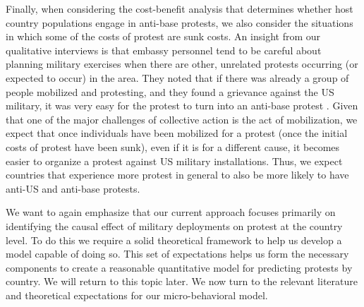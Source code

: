  




Finally, when considering the cost-benefit analysis that determines whether host country populations engage in anti-base protests, we also consider the situations in which some of the costs of protest are sunk costs. An insight from our qualitative interviews is that embassy personnel tend to be careful about planning military exercises when there are other, unrelated protests occurring (or expected to occur) in the area.  They noted that if there was already a group of people mobilized and protesting, and they found a grievance against the US military, it was very easy for the protest to turn into an anti-base protest \cite{embone20180712,embthree20180712}.  Given that one of the major challenges of collective action is the act of mobilization, we expect that once individuals have been mobilized for a protest (once the initial costs of protest have been sunk), even if it is for a different cause, it becomes easier to organize a protest against US military installations. Thus, we expect countries that experience more protest in general to also be more likely to have anti-US and anti-base protests. 

We want to again emphasize that our current approach focuses primarily on identifying the causal effect of military deployments on protest at the country level. To do this we require a solid theoretical framework to help us develop a model capable of doing so. This set of expectations helps us form the necessary components to create a reasonable quantitative model for predicting protests by country. We will return to this topic later. We now turn to the relevant literature and theoretical expectations for our micro-behavioral model. 

